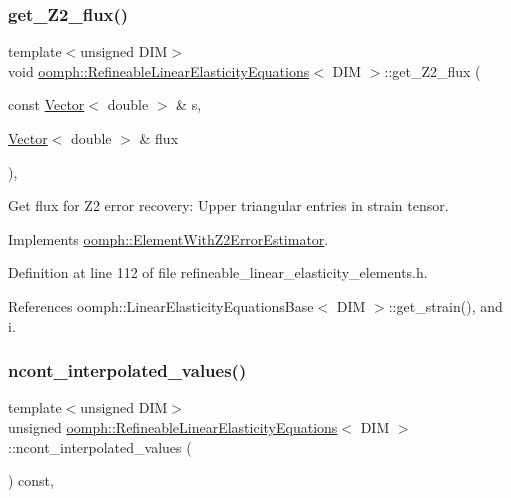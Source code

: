 \subsubsection{\texorpdfstring{get\+\_\+\+Z2\+\_\+flux()}{get\_Z2\_flux()}}
{\footnotesize\ttfamily template$<$unsigned D\+IM$>$ \\
void \hyperlink{classoomph_1_1RefineableLinearElasticityEquations}{oomph\+::\+Refineable\+Linear\+Elasticity\+Equations}$<$ D\+IM $>$\+::get\+\_\+\+Z2\+\_\+flux (\begin{DoxyParamCaption}\item[{const \hyperlink{classoomph_1_1Vector}{Vector}$<$ double $>$ \&}]{s,  }\item[{\hyperlink{classoomph_1_1Vector}{Vector}$<$ double $>$ \&}]{flux }\end{DoxyParamCaption})\hspace{0.3cm}{\ttfamily [inline]}, {\ttfamily [virtual]}}



Get \textquotesingle{}flux\textquotesingle{} for Z2 error recovery\+: Upper triangular entries in strain tensor. 



Implements \hyperlink{classoomph_1_1ElementWithZ2ErrorEstimator_a5688ff5f546d81771cabad82ca5a7556}{oomph\+::\+Element\+With\+Z2\+Error\+Estimator}.



Definition at line 112 of file refineable\+\_\+linear\+\_\+elasticity\+\_\+elements.\+h.



References oomph\+::\+Linear\+Elasticity\+Equations\+Base$<$ D\+I\+M $>$\+::get\+\_\+strain(), and i.

\mbox{\label{classoomph_1_1RefineableLinearElasticityEquations_a1a06914f28c80c10dfb485353a3ea677}} 
\subsubsection{\texorpdfstring{ncont\+\_\+interpolated\+\_\+values()}{ncont\_interpolated\_values()}}
{\footnotesize\ttfamily template$<$unsigned D\+IM$>$ \\
unsigned \hyperlink{classoomph_1_1RefineableLinearElasticityEquations}{oomph\+::\+Refineable\+Linear\+Elasticity\+Equations}$<$ D\+IM $>$\+::ncont\+\_\+interpolated\+\_\+values (\begin{DoxyParamCaption}{ }\end{DoxyParamCaption}) const\hspace{0.3cm}{\ttfamily [inline]}, {\ttfamily [virtual]}}



